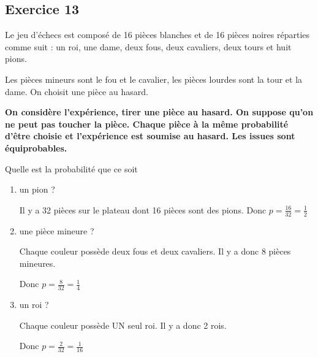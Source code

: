\documentclass[openany]{book}
\begin{document}
\begin{minipage}{0.5\linewidth}
 
\subsection{Exercice 13}
 
Le jeu d'échecs est composé de 16 pièces blanches et de 16 pièces noires réparties comme suit : un roi, une dame, deux fous, deux cavaliers, deux tours et huit pions.

Les pièces mineurs sont le fou et le cavalier, les pièces lourdes sont la tour et la dame. On choisit une pièce au hasard.


\textbf{On considère l'expérience, tirer une pièce au hasard. On suppose qu'on ne peut pas toucher la pièce. Chaque pièce à la même probabilité d'être choisie et l'expérience est soumise au hasard. Les issues sont équiprobables.}  

Quelle est la probabilité que ce soit
\begin{enumerate}
\item un pion ?

Il y a 32 pièces sur le plateau dont 16 pièces sont des pions. Donc $p = \frac{16}{32}= \frac{1}{2}$


\item une pièce mineure ?

Chaque couleur possède deux fous et deux cavaliers. Il y a donc 8 pièces mineures.

Donc $p = \frac{8}{32}= \frac{1}{4}$

\item un roi ?

Chaque couleur possède UN seul roi. Il y a donc 2 rois.

Donc $p = \frac{2}{32}= \frac{1}{16}$

\end{enumerate} 
 
 
\end{minipage}


\newpage
\end{document}
